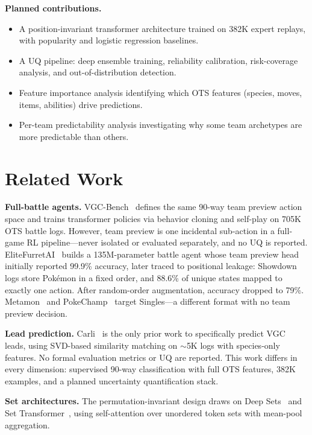 \documentclass[11pt]{article}
\begin{document}
\textbf{Planned contributions.}
\begin{itemize}
    \item A position-invariant transformer architecture trained on 382K expert replays, with popularity and logistic regression baselines.
    \item A UQ pipeline: deep ensemble training, reliability calibration, risk-coverage analysis, and out-of-distribution detection.
    \item Feature importance analysis identifying which OTS features (species, moves, items, abilities) drive predictions.
    \item Per-team predictability analysis investigating why some team archetypes are more predictable than others.
\end{itemize}


\section{Related Work}
\label{sec:related}

\textbf{Full-battle agents.}
VGC-Bench~\cite{vgcbench} defines the same 90-way team preview action space and trains transformer policies via behavior cloning and self-play on 705K OTS battle logs.
However, team preview is one incidental sub-action in a full-game RL pipeline---never isolated or evaluated separately, and no UQ is reported.
EliteFurretAI~\cite{elitefurretai} builds a 135M-parameter battle agent whose team preview head initially reported 99.9\% accuracy, later traced to positional leakage: Showdown logs store Pok\'emon in a fixed order, and 88.6\% of unique states mapped to exactly one action.
After random-order augmentation, accuracy dropped to 79\%.
Metamon~\cite{metamon} and PokeChamp~\cite{pokechamp} target Singles---a different format with no team preview decision.

\textbf{Lead prediction.}
Carli~\cite{carli2025} is the only prior work to specifically predict VGC leads, using SVD-based similarity matching on ${\sim}$5K logs with species-only features.
No formal evaluation metrics or UQ are reported.
This work differs in every dimension: supervised 90-way classification with full OTS features, 382K examples, and a planned uncertainty quantification stack.

\textbf{Set architectures.}
The permutation-invariant design draws on Deep Sets~\cite{deepsets} and Set Transformer~\cite{settransformer}, using self-attention over unordered token sets with mean-pool aggregation.
\end{document}
